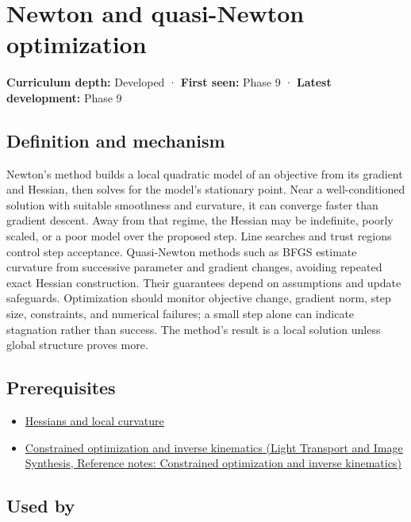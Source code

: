 \hypertarget{appendix-54c8f5828387}{}\label{referencestart:appendix-54c8f5828387}
\section{Newton and quasi-Newton optimization}\label{appendix-54c8f5828387-newton-and-quasi-newton-optimization}

\textbf{Curriculum depth:} Developed · \textbf{First seen:} Phase 9 · \textbf{Latest development:} Phase 9

\subsection{Definition and mechanism}\label{appendix-54c8f5828387-definition-and-mechanism}

Newton's method builds a local quadratic model of an objective from its gradient and Hessian, then solves for the model's stationary point. Near a well-conditioned solution with suitable smoothness and curvature, it can converge faster than gradient descent. Away from that regime, the Hessian may be indefinite, poorly scaled, or a poor model over the proposed step. Line searches and trust regions control step acceptance. Quasi-Newton methods such as BFGS estimate curvature from successive parameter and gradient changes, avoiding repeated exact Hessian construction. Their guarantees depend on assumptions and update safeguards. Optimization should monitor objective change, gradient norm, step size, constraints, and numerical failures; a small step alone can indicate stagnation rather than success. The method's result is a local solution unless global structure proves more.

\subsection{Prerequisites}\label{appendix-54c8f5828387-prerequisites}

\begin{itemize}
\tightlist
\item
  \hyperref[appendix-6ac071f8b50c]{Hessians and local curvature}
\item
  \href{../04-Light-Transport-and-Image-Synthesis/main.pdf\#nameddest=appendix-29f4bea4c2bb}{Constrained optimization and inverse kinematics (Light Transport and Image Synthesis, Reference notes: Constrained optimization and inverse kinematics)}
\end{itemize}

\subsection{Used by}\label{appendix-54c8f5828387-used-by}


